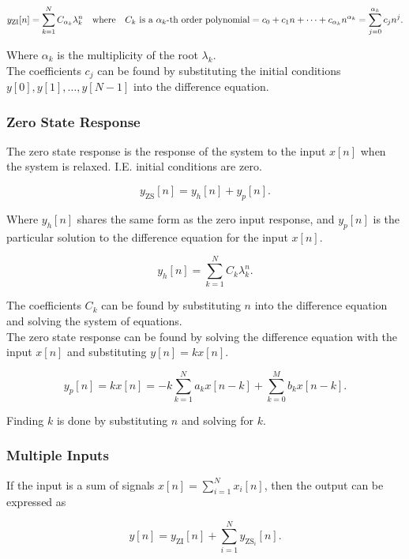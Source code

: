\documentclass{report}
\begin{document}
\[
	y_\text{ZI}[n] = \sum_{k=1}^{N} C_{\alpha_k} \lambda_k^n \qq{where} C_k \text{ is a $\alpha_k$-th order polynomial} = c_0 + c_1n + \cdots + c_{\alpha_k} n^{\alpha_k} = \sum_{j=0}^{\alpha_k} c_jn^j
	.\]

Where $\alpha_k$ is the multiplicity of the root $\lambda_k$.\\

The coefficients $c_j$ can be found by substituting the initial conditions $y[0], y[1], \ldots, y[N-1]$ into the difference equation.

\subsubsection{Zero State Response}

The zero state response is the response of the system to the input $x[n]$ when the system is relaxed. I.E. initial conditions are zero.

\[
	y_\text{ZS}[n] = y_h[n] + y_p[n]
	.\]

Where $y_h[n]$ shares the same form as the zero input response, and $y_p[n]$ is the particular solution to the difference equation for the input $x[n]$.

\[
	y_h[n] = \sum_{k=1}^{N} C_k \lambda_k^n
	.\]

The coefficients $C_k$ can be found by substituting $n$ into the difference equation and solving the system of equations.\\

The zero state response can be found by solving the difference equation with the input $x[n]$ and substituting $y[n] = kx[n]$.

\[
	y_p[n] = kx[n] = -k \sum_{k=1}^{N} a_k x[n-k] + \sum_{k=0}^{M} b_k x[n-k]
	.\]

Finding $k$ is done by substituting $n$ and solving for $k$.


\subsubsection{Multiple Inputs}

If the input is a sum of signals $x[n] = \sum_{i=1}^{N} x_i[n]$, then the output can be expressed as

\[
	y[n] = y_\text{ZI}[n] + \sum_{i=1}^{N} y_{\text{ZS}_i}[n]
	.\]
\end{document}
